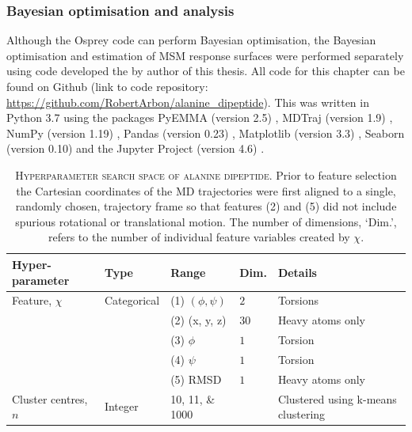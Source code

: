 \subsubsection*{Bayesian optimisation and analysis}
Although the Osprey code can perform Bayesian optimisation, the Bayesian optimisation and estimation of MSM response surfaces were performed separately using code developed the by author of this thesis. All code for this chapter can be found on Github (link to code repository: \href{https://github.com/RobertArbon/alanine_dipeptide/tree/fbe3ac7259e4da5cab15a60bffa9725b0b322bfd}{\color{blue}https://github.com/RobertArbon/alanine\_dipeptide}). This was written in Python 3.7 using the packages PyEMMA (version 2.5) \cite{schererPyEMMASoftwarePackage2015a}, MDTraj (version 1.9) \cite{mcgibbonMDTrajModernOpen2015}, NumPy (version 1.19) \cite{waltNumPyArrayStructure2011}, Pandas (version 0.23) \cite{mckinneyPandasFoundationalPython2011}, Matplotlib (version 3.3) \cite{hunterMatplotlib2DGraphics2007},  Seaborn (version 0.10) \cite{michaelwaskomMwaskomSeabornV02020} and the Jupyter Project (version 4.6) \cite{kluyverJupyterNotebooksPublishing2016}.

\begin{table}
    \centering
    \begin{tabularx}{0.9\textwidth}{ >{\raggedright\arraybackslash}X lll >{\raggedright\arraybackslash}X } 
    \hline
    \textbf{Hyper-parameter} & \textbf{Type} & \textbf{Range} &\textbf{Dim.} & \textbf{Details} \\
     \hline\hline
    Feature, $\chi$ & Categorical & (1) $(\phi, \psi)$ & $2$ & Torsions \\
    & & (2) (x, y, z) & $30$ & Heavy atoms only  \\
    & & (3) $\phi$ & $1$ & Torsion \\ 
    & & (4) $\psi$ & $1$ & Torsion \\ 
    & & (5) RMSD & $1$ & Heavy atoms only\\ 
    \hline 
    Cluster centres, $n$ & Integer & \numlist[list-final-separator = { ... }]{10;11;1000} & & Clustered using k-means clustering \\
     \hline
    \end{tabularx}
    \caption[Hyperparameter search space of alanine dipeptide]{\textsc{Hyperparameter search space of alanine dipeptide}. Prior to feature selection the Cartesian coordinates of the MD trajectories were first aligned to a single, randomly chosen, trajectory frame so that features (2) and (5) did not include spurious rotational or translational motion.  The number of dimensions, `Dim.', refers to the number of individual feature variables created by $\chi$.}
    \label{tab:ala2searchspace}
\end{table}

